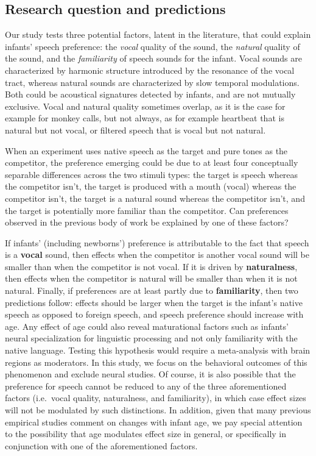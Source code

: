 \documentclass[
  man,mask,floatsintext]{apa6}
\begin{document}
\hypertarget{research-question-and-predictions}{%
\subsection{Research question and predictions}\label{research-question-and-predictions}}

Our study tests three potential factors, latent in the literature, that could explain infants' speech preference: the \emph{vocal} quality of the sound, the \emph{natural} quality of the sound, and the \emph{familiarity} of speech sounds for the infant. Vocal sounds are characterized by harmonic structure introduced by the resonance of the vocal tract, whereas natural sounds are characterized by slow temporal modulations. Both could be acoustical signatures detected by infants, and are not mutually exclusive. Vocal and natural quality sometimes overlap, as it is the case for example for monkey calls, but not always, as for example heartbeat that is natural but not vocal, or filtered speech that is vocal but not natural.

When an experiment uses native speech as the target and pure tones as the competitor, the preference emerging could be due to at least four conceptually separable differences across the two stimuli types: the target is speech whereas the competitor isn't, the target is produced with a mouth (vocal) whereas the competitor isn't, the target is a natural sound whereas the competitor isn't, and the target is potentially more familiar than the competitor. Can preferences observed in the previous body of work be explained by one of these factors?

If infants' (including newborns') preference is attributable to the fact that speech is a \textbf{vocal} sound, then effects when the competitor is another vocal sound will be smaller than when the competitor is not vocal. If it is driven by \textbf{naturalness}, then effects when the competitor is natural will be smaller than when it is not natural. Finally, if preferences are at least partly due to \textbf{familiarity}, then two predictions follow: effects should be larger when the target is the infant's native speech as opposed to foreign speech, and speech preference should increase with age. Any effect of age could also reveal maturational factors such as infants' neural specialization for linguistic processing and not only familiarity with the native language. Testing this hypothesis would require a meta-analysis with brain regions as moderators. In this study, we focus on the behavioral outcomes of this phenomenon and exclude neural studies. Of course, it is also possible that the preference for speech cannot be reduced to any of the three aforementioned factors (i.e.~vocal quality, naturalness, and familiarity), in which case effect sizes will not be modulated by such distinctions. In addition, given that many previous empirical studies comment on changes with infant age, we pay special attention to the possibility that age modulates effect size in general, or specifically in conjunction with one of the aforementioned factors.
\end{document}
